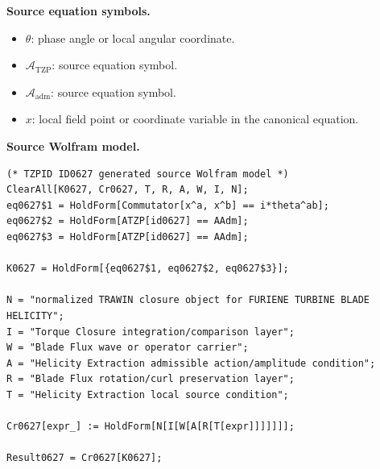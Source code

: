 \begin{minipage}[t]{0.49\linewidth}
\begingroup
\small
\raggedright
\textbf{Source equation symbols.}\par
\begin{itemize}[leftmargin=1.35em,itemsep=1pt,topsep=1pt,parsep=0pt]
    \item $\theta$: phase angle or local angular coordinate.
    \item $\mathcal{A}_{\mathrm{TZP}}$: source equation symbol.
    \item $\mathcal{A}_{\mathrm{adm}}$: source equation symbol.
    \item $x$: local field point or coordinate variable in the canonical equation.
\end{itemize}
\endgroup
\end{minipage}\hfill
\begin{minipage}[t]{0.47\linewidth}
\begingroup
\scriptsize
\raggedright
\textbf{Source Wolfram model.}\par
\begin{Verbatim}[fontsize=\tiny,breaklines=true,breakanywhere=true]
(* TZPID ID0627 generated source Wolfram model *)
ClearAll[K0627, Cr0627, T, R, A, W, I, N];
eq0627$1 = HoldForm[Commutator[x^a, x^b] == i*theta^ab];
eq0627$2 = HoldForm[ATZP[id0627] == AAdm];
eq0627$3 = HoldForm[ATZP[id0627] == AAdm];

K0627 = HoldForm[{eq0627$1, eq0627$2, eq0627$3}];

N = "normalized TRAWIN closure object for FURIENE TURBINE BLADE HELICITY";
I = "Torque Closure integration/comparison layer";
W = "Blade Flux wave or operator carrier";
A = "Helicity Extraction admissible action/amplitude condition";
R = "Blade Flux rotation/curl preservation layer";
T = "Helicity Extraction local source condition";

Cr0627[expr_] := HoldForm[N[I[W[A[R[T[expr]]]]]]];

Result0627 = Cr0627[K0627];
\end{Verbatim}
\endgroup
\end{minipage}

